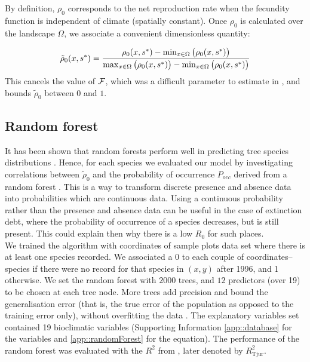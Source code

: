 By definition, $ \rho_0 $ corresponds to the net reproduction rate when the
fecundity function is independent of climate (\ie spatially constant). Once $
\rho_0 $ is calculated over the landscape $ \Omega $, we associate a
convenient dimensionless quantity:

\begin{equation} \label{eq::rho0_scaled}
	\tilde \rho_0(x, {s}^{*}) = \frac{\rho_0(x, {s}^{*}) - \min_{x \in \Omega} \big(\rho_0(x, {s}^{*}) \big)}{\max_{x \in \Omega} \big(\rho_0(x, {s}^{*}) \big) - \min_{x \in \Omega} \big(\rho_0(x, {s}^{*}) \big)}
\end{equation}
This cancels the value of $ \mathcal{F} $, which was a difficult parameter to estimate in \citet{Purves2008}, and bounds $ \tilde \rho_0 $ between $ 0 $ and $ 1 $.

\subsection{Random forest}

It has been shown that random forests perform well in predicting tree species
distributions \citep{Prasad2006}. Hence, for each species we evaluated our model by
investigating correlations between $ \tilde \rho_0 $ and the probability of
occurrence $ P_{occ} $ derived from a random forest \citep[R package]{randomForest}.
This is a way to transform discrete
presence and absence data into probabilities which are continuous data. Using a continuous probability rather than the presence and absence data can be useful in the case of extinction debt, where the probability of occurrence of a species decreases, but is still present. This could explain then why there is a low $ R_0 $ for such places. \\

We trained the algorithm with coordinates of sample plots data set where there is
at least one species recorded. We associated a 0 to each couple of
coordinates--species if there were no record for that species in $ (x, y) $
after 1996, and 1 otherwise. We set the random forest with $ 2000 $ trees, and
$ 12 $ predictors (over 19) to be chosen at each tree node. More trees add
precision and bound the generalisation error (that is, the true error of the
population as opposed to the training error only), without overfitting the
data \citep{Prasad2006}. The explanatory variables set contained
19 bioclimatic variables (Supporting Information \ref{app::database} for the
variables and \ref{app::randomForest} for the equation). The performance of
the random forest was evaluated with the $ R^2 $ from \citet{Tjur2009}, later
denoted by $ R_{\text{Tjur}}^2 $.

